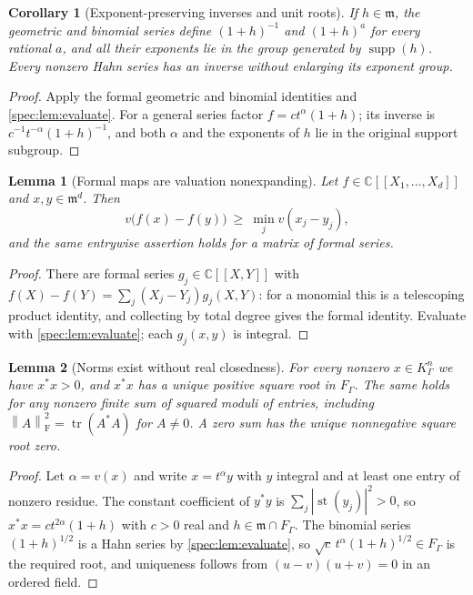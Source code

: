 \documentclass[11pt,a4paper]{article}
\numberwithin{equation}{section}
\newtheorem{lemma}[lemma]{Lemma}
\newtheorem{corollary}[corollary]{Corollary}
\theoremstyle{definition}
\theoremstyle{remark}
\newcommand{\C}{\mathbb C}
\newcommand{\mm}{\mathfrak m}
\newcommand{\supp}{\operatorname{supp}}
\newcommand{\st}{\operatorname{st}}
\newcommand{\tr}{\operatorname{tr}}
\newcommand{\Fr}{\mathrm F}
\newcommand{\norm}[1]{\left\lVert#1\right\rVert}
\begin{document}
\begin{corollary}[Exponent-preserving inverses and unit roots]\label{spec:cor:unitroots}
If $h\in\mm$, the geometric and binomial series define $(1+h)^{-1}$ and
$(1+h)^a$ for every rational $a$, and all their exponents lie in the group
generated by $\supp(h)$. Every nonzero Hahn series has an inverse without
enlarging its exponent group.
\end{corollary}
\begin{proof}
Apply the formal geometric and binomial identities and
\cref{spec:lem:evaluate}. For a general series factor $f=ct^\alpha(1+h)$;
its inverse is $c^{-1}t^{-\alpha}(1+h)^{-1}$, and both $\alpha$ and the
exponents of $h$ lie in the original support subgroup.
\end{proof}

\begin{lemma}[Formal maps are valuation nonexpanding]\label{spec:lem:lipschitz}
Let $f\in\C[[X_1,\ldots,X_d]]$ and $x,y\in\mm^d$. Then
\[
 v\bigl(f(x)-f(y)\bigr)\ \ge\ \min_jv(x_j-y_j),
\]
and the same entrywise assertion holds for a matrix of formal series.
\end{lemma}
\begin{proof}
There are formal series $g_j\in\C[[X,Y]]$ with
$f(X)-f(Y)=\sum_j(X_j-Y_j)g_j(X,Y)$: for a monomial this is a telescoping
product identity, and collecting by total degree gives the formal identity.
Evaluate with \cref{spec:lem:evaluate}; each $g_j(x,y)$ is integral.
\end{proof}

\begin{lemma}[Norms exist without real closedness]\label{spec:lem:normroot}
For every nonzero $x\in K_\Gamma^n$ we have $x^*x>0$, and $x^*x$ has a
unique positive square root in $F_\Gamma$. The same holds for any nonzero
finite sum of squared moduli of entries, including
$\norm A_{\Fr}^2=\tr(A^*A)$ for $A\ne0$. A zero sum has the unique
nonnegative square root zero.
\end{lemma}
\begin{proof}
Let $\alpha=v(x)$ and write $x=t^\alpha y$ with $y$ integral and at least
one entry of nonzero residue. The constant coefficient of $y^*y$ is
$\sum_j|\st(y_j)|^2>0$, so $x^*x=ct^{2\alpha}(1+h)$ with $c>0$ real and
$h\in\mm\cap F_\Gamma$. The binomial series $(1+h)^{1/2}$ is a Hahn series
by \cref{spec:lem:evaluate}, so $\sqrt c\,t^\alpha(1+h)^{1/2}\in F_\Gamma$
is the required root, and uniqueness follows from $(u-v)(u+v)=0$ in an
ordered field.
\end{proof}
\end{document}
